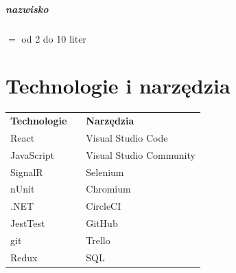 \documentclass[10pt]{report}
\begin{document}
		\paragraph{nazwisko} $=$ od 2 do 10 liter


\chapter{Technologie i narzędzia}

	\begin{center}
		\begin{table}[h]
			\def\arraystretch{1.3}
			\begin{tabular}{lll}
				
				\textbf{Technologie} & \hspace{50mm} & \textbf{Narzędzia}      \\
				React                &  & Visual Studio Code      	\\
				JavaScript           &  & Visual Studio Community 	\\
				SignalR              &  & Selenium                	\\
				nUnit                &  & Chromium                	\\
				.NET                 &  & CircleCI                	\\
				JestTest             &  & GitHub                  	\\
				git                  &  & Trello                       	\\
				Redux				 &  & SQL						\\
			\end{tabular}
		\end{table}
\end{center}
	
	
\end{document}
